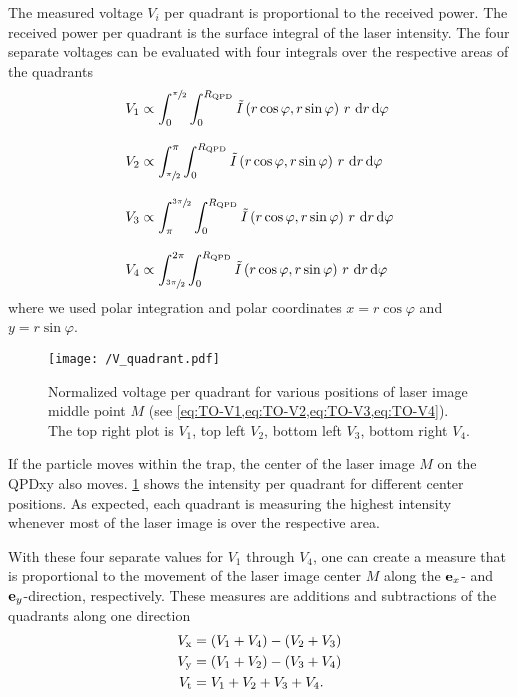 The measured voltage $V_{i}$ per quadrant is proportional to the received 
power. The received power per quadrant is the surface integral of the laser 
intensity. The four separate voltages can be evaluated with four integrals over 
the respective areas of the quadrants
\begin{subequations}
\begin{align}
  V_{\mathrm{1}} & \propto \int_{0}^{\sfrac{\pi}{2}}\int_{0}^{R_{\mathrm{QPD}}}
  \tilde{I}\left( r\cos\varphi, r\sin\varphi 
  \right)\,r\,\dd{r}\dd{\varphi}
  \label{eq:TO-V1}
  \\[3mm]
  V_{\mathrm{2}} & \propto \int_{\sfrac{\pi}{2}}^{\pi}\int_{0}^{R_{\mathrm{QPD}}}
  \tilde{I}\left(r\cos\varphi, 
  r\sin\varphi\right)\,r\,\dd{r}\dd{\varphi}
  \label{eq:TO-V2}
  \\[3mm]
  V_{\mathrm{3}} & \propto \int_{\pi}^{\sfrac{3\pi}{2}}\int_{0}^{R_{\mathrm{QPD}}}
  \tilde{I}\left(r\cos\varphi, 
  r\sin\varphi\right)\,r\,\dd{r}\dd{\varphi}
  \label{eq:TO-V3}
  \\[3mm]
  V_{\mathrm{4}} & \propto \int_{\sfrac{3\pi}{2}}^{2\pi}\int_{0}^{R_{\mathrm{QPD}}}
  \tilde{I}\left(r\cos\varphi, 
  r\sin\varphi\right)\,r\,\dd{r}\dd{\varphi}
  \label{eq:TO-V4}
\end{align}
\end{subequations}
where we used polar integration and polar coordinates $x=r\cos\varphi$ and 
$y=r\sin\varphi$.

\begin{figure}[tbp]
  \centering
  \texttt{[image: /V\_quadrant.pdf]}
  \caption{Normalized voltage per quadrant for various positions of laser image 
  middle point $M$ (see \cref{eq:TO-V1,eq:TO-V2,eq:TO-V3,eq:TO-V4}). The top 
right plot is $V_{1}$, top left $V_{2}$, bottom left $V_{3}$, bottom right 
$V_{4}$.}
  \label{fig:TO-quadrant_Intensity}
\end{figure}

If the particle moves within the trap, the center of the laser image $M$ on the 
QPDxy also moves. \cref{fig:TO-quadrant_Intensity} shows the intensity per 
quadrant for different center positions. As expected, each quadrant is 
measuring the highest intensity whenever most of the laser image is over the 
respective area.

With these four separate values for $V_{1}$ through $V_{4}$, one can create a 
measure that is proportional to the movement of the laser image center $M$ 
along the $\vb{e}_{x}$- and $\vb{e}_{y}$-direction, respectively. These measures are 
additions and subtractions of the quadrants along one direction
\begin{subequations}
\begin{align}
  V_{\mathrm{x}} & = \left( V_{\mathrm{1}}+V_{\mathrm{4}} \right) - \left( V_{\mathrm{2}} + 
  V_{\mathrm{3}}  \right)
  \label{eq:TO-Vx} \\
  V_{\mathrm{y}} & = \left( V_{\mathrm{1}}+V_{\mathrm{2}} \right) - \left( V_{\mathrm{3}} + 
  V_{\mathrm{4}}  \right)
  \label{eq:TO-Vy} \\
  V_{\mathrm{t}} & = V_{\mathrm{1}}+V_{\mathrm{2}} + V_{\mathrm{3}} + V_{\mathrm{4}}.
  \label{eq:TO-Vt}
\end{align}
\end{subequations}

